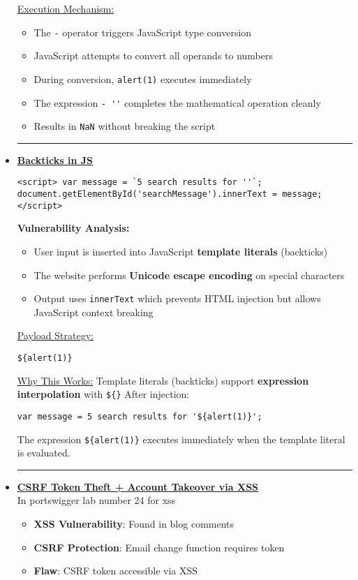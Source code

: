 \documentclass{article}
\begin{document}
\begin{itemize}
\newpage
\underline{Execution Mechanism:}
\begin{itemize}
\item The \verb|-| operator triggers JavaScript type conversion
\item JavaScript attempts to convert all operands to numbers
\item During conversion, \verb|alert(1)| executes immediately
\item The expression \verb|- ''| completes the mathematical operation cleanly
\item Results in \verb|NaN| without breaking the script
\end{itemize}
\rule{5cm}{0.4pt}
\item \textbf{\underline{Backticks in JS}}
\begin{lstlisting}[frame=single]
<script> var message = `5 search results for ''`;
document.getElementById('searchMessage').innerText = message; </script>
\end{lstlisting}
\textbf{Vulnerability Analysis:}
\begin{itemize}
\item User input is inserted into JavaScript \textbf{template literals} (backticks)
\item The website performs \textbf{Unicode escape encoding} on special characters
\item Output uses \texttt{innerText} which prevents HTML injection but allows JavaScript context breaking
\end{itemize}

\underline{Payload Strategy:}
\begin{lstlisting}[frame=single]
${alert(1)}
\end{lstlisting}

\underline{Why This Works:}
Template literals (backticks) support \textbf{expression interpolation} with \verb|${}|
After injection:
\begin{lstlisting}[frame=single]
var message = 5 search results for '${alert(1)}';
\end{lstlisting}
The expression \verb|${alert(1)}| executes immediately when the template literal is evaluated.

\rule{5cm}{0.4pt}
\item \textbf{\underline{ CSRF Token Theft + Account Takeover via XSS}}     
\\In portswigger lab number 24 for xss
\begin{itemize}
\item \textbf{XSS Vulnerability}: Found in blog comments
\item \textbf{CSRF Protection}: Email change function requires token
\item \textbf{Flaw}: CSRF token accessible via XSS
\end{itemize}


\end{itemize}
\end{document}
